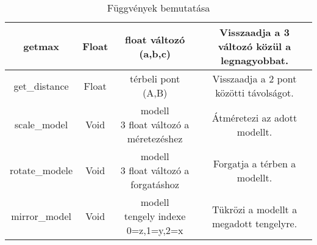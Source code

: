 \begin{table}[h]
\begin{tabular}{|c|c|c|c|}
		getmax&Float&\parbox{2.7cm}{ float változó\\(a,b,c)}&\parbox{4.3cm}{\centering Visszaadja a 3 változó közül a legnagyobbat.}\\ \hline
		
		get\_distance&Float&\parbox{2.7cm}{ térbeli pont\\(A,B)}&\parbox{4.3cm}{\centering Visszaadja a 2 pont közötti távolságot.}\\ \hline	
			
		scale\_model&Void&\parbox{2.7cm}{\centering modell\\3 float változó a méretezéshez}&\parbox{4.3cm}{\centering Átméretezi az adott modellt.}\\ \hline	
			
		rotate\_modele&Void&\parbox{2.7cm}{\centering modell\\3 float változó a forgatáshoz}&\parbox{4.3cm}{\centering Forgatja a térben a modellt.}\\ \hline		
		
		mirror\_model&Void&\parbox{2.7cm}{\centering modell\\tengely indexe\\0=z,1=y,2=x}&\parbox{4.3cm}{\centering Tükrözi a modellt a megadott tengelyre.}\\ \hline
		
	\end{tabular}
	\caption{Függvények bemutatása}
	\label{tab:fug}
\end{table}
